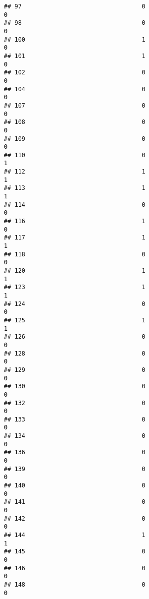 \documentclass[
]{article}
\begin{document}
\begin{verbatim}
## 97                                  0                                0
## 98                                  0                                0
## 100                                 1                                0
## 101                                 1                                0
## 102                                 0                                0
## 104                                 0                                0
## 107                                 0                                0
## 108                                 0                                0
## 109                                 0                                0
## 110                                 0                                1
## 112                                 1                                1
## 113                                 1                                1
## 114                                 0                                0
## 116                                 1                                0
## 117                                 1                                1
## 118                                 0                                0
## 120                                 1                                1
## 123                                 1                                1
## 124                                 0                                0
## 125                                 1                                1
## 126                                 0                                0
## 128                                 0                                0
## 129                                 0                                0
## 130                                 0                                0
## 132                                 0                                0
## 133                                 0                                0
## 134                                 0                                0
## 136                                 0                                0
## 139                                 0                                0
## 140                                 0                                0
## 141                                 0                                0
## 142                                 0                                0
## 144                                 1                                1
## 145                                 0                                0
## 146                                 0                                0
## 148                                 0                                0

\end{verbatim}
\end{document}
